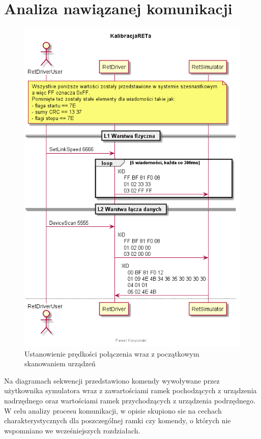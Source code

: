 \chapter{Analiza nawiązanej komunikacji}
    \begin{figure}[h!]
    \centering
    \includegraphics[scale=0.70]{out/Diagramy/UML_DiagramOfSequence_New/KalibracjaRETa-page1.png}
    \caption{Ustanowienie prędkości połączenia wraz z początkowym skanowaniem urządzeń}
    \end{figure}
    \newpage

    Na diagramach sekwencji przedstawiono komendy wywoływane przez użytkownika
    symulatora wraz z zawartościami ramek pochodzących z urządzenia nadrzędnego oraz
    wartościami ramek przychodzących z urządzenia podrzędnego.
    W celu analizy procesu komunikacji, w opisie skupiono sie na cechach charakterystycznych
    dla poszczególnej ramki czy komendy, o których nie wspomniano we wcześniejszych rozdziałach.
    
